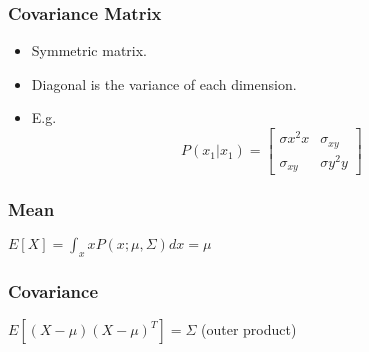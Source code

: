 \documentclass[12pt]{article}
\begin{document}
            \subsubsection{Covariance Matrix}
                \begin{itemize}
                    \item Symmetric matrix.
                    \item Diagonal is the variance of each dimension.
                    \item E.g.\
                    \begin{equation}
                        P(x_1|x_1) = \begin{bmatrix}
                            \sigma{}{x}^2{x} & \sigma_{xy} \\
                            \sigma_{xy} & \sigma{}{y}^2{y}
                        \end{bmatrix}
                    \end{equation}
                \end{itemize}
            \subsubsection{Mean}
                $E[X] = \int_{x} xP(x; \mu, \Sigma)dx = \mu$
            \subsubsection{Covariance}
                $E[(X - \mu){(X - \mu)}^T] = \Sigma$ (outer product)
\end{document}
